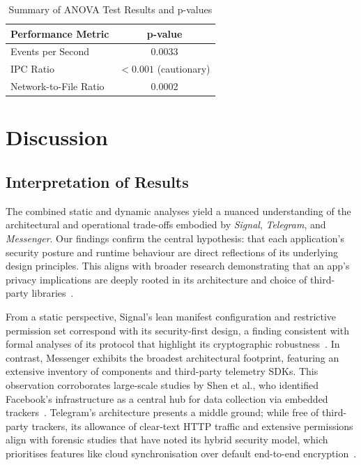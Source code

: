 \documentclass[a4paper,12pt]{report}
\begin{document}
\begin{table}[H]
\centering
\caption{Summary of ANOVA Test Results and p-values}
\label{tab:comparative_tests_en}
\begin{tabular}{lc}
\toprule
\textbf{Performance Metric} & \textbf{p-value} \\
\midrule
Events per Second & 0.0033 \\
IPC Ratio & $< 0.001$ (cautionary) \\
Network-to-File Ratio & 0.0002 \\
\bottomrule
\end{tabular}
\end{table}


\chapter{Discussion}

\section{Interpretation of Results}

The combined static and dynamic analyses yield a nuanced understanding of the architectural and operational trade-offs embodied by \textit{Signal}, \textit{Telegram}, and \textit{Messenger}. Our findings confirm the central hypothesis: that each application's security posture and runtime behaviour are direct reflections of its underlying design principles. This aligns with broader research demonstrating that an app's privacy implications are deeply rooted in its architecture and choice of third-party libraries~\cite{ShenVervierStringhini2021}.

From a static perspective, Signal’s lean manifest configuration and restrictive permission set correspond with its security-first design, a finding consistent with formal analyses of its protocol that highlight its cryptographic robustness~\cite{CohnGordon2017SignalAnalysis}. In contrast, Messenger exhibits the broadest architectural footprint, featuring an extensive inventory of components and third-party telemetry SDKs. This observation corroborates large-scale studies by Shen et al., who identified Facebook's infrastructure as a central hub for data collection via embedded trackers~\cite{ShenVervierStringhini2021}. Telegram's architecture presents a middle ground; while free of third-party trackers, its allowance of clear-text HTTP traffic and extensive permissions align with forensic studies that have noted its hybrid security model, which prioritises features like cloud synchronisation over default end-to-end encryption~\cite{moltchanov2018telegram}.
\end{document}
